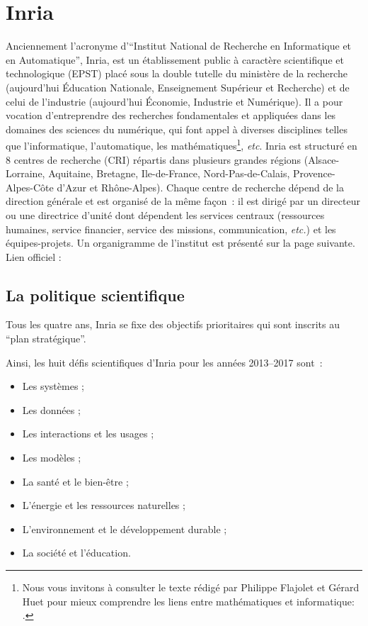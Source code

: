 
\chapter{Inria} \label{INRIA}

Anciennement l'acronyme d'``Institut National de Recherche en Informatique et en Automatique'',
Inria, est un \'etablissement public \`a caract\`ere scientifique et technologique (EPST) plac\'e sous la double tutelle du minist\`ere de la
recherche (aujourd'hui \'Education Nationale, Enseignement Sup\'erieur et Recherche) 
et de celui de l'industrie (aujourd'hui \'Economie, Industrie et Num\'erique). 
Il a pour vocation d'entreprendre des recherches fondamentales et appliqu\'ees dans les domaines des
sciences du num\'erique, qui font appel \`a diverses disciplines telles que l'informatique,
l'automatique, les math\'ematiques\footnote{%
Nous vous invitons \`a consulter le texte r\'edig\'e par Philippe Flajolet et G\'erard Huet 
pour mieux comprendre les liens entre math\'ematiques et informatique:
.}, 
{\em etc}. Inria est structur\'e
en 8 centres de recherche (CRI) r\'epartis dans plusieurs grandes r\'egions
(Alsace-Lorraine, Aquitaine, Bretagne, Ile-de-France, Nord-Pas-de-Calais, 
Provence-Alpes-C\^ote d'Azur et Rh\^one-Alpes).
Chaque centre de recherche d\'epend de la direction g\'en\'erale et 
est organis\'e de la m\^eme fa\c{c}on~: il est dirig\'e par un directeur ou une directrice d'unit\'e 
dont d\'ependent les services centraux (ressources humaines, service financier, service des
missions, communication, {\em etc.}) et les \'equipes-projets.
Un organigramme de l'institut est pr\'esent\'e sur la page suivante.
Lien officiel : {}

\section{La politique scientifique}
Tous les quatre ans, Inria se fixe des objectifs prioritaires qui
sont inscrits au ``plan strat\'egique''.


Ainsi, les huit d\'efis scientifiques d'Inria pour les ann\'ees 2013--2017
sont~:
\begin{multicols}{2}
\begin{itemize}
	\item Les syst\`emes ;
	\item Les donn\'ees ;
	\item Les interactions et les usages ;
	\item Les mod\`eles ;
	\item La sant\'e et le bien-\^etre ;
	\item L'\'energie et les ressources naturelles ;
	\item L'environnement et le d\'eveloppement durable ;
	\item La soci\'et\'e et l'\'education.
\end{itemize}
\end{multicols}

